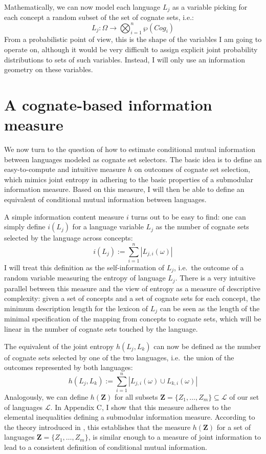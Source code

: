 Mathematically, we can now model each language $L_j$ as a variable picking for each concept a random subset of the set of cognate sets, i.e.:
\begin{equation}
  L_j: \Omega \rightarrow \bigotimes_{i = 1}^{n} \wp(Cog_i)
\end{equation}
From a probabilistic point of view, this is the shape of the variables I am going to operate on, although it would be very difficult to assign explicit joint probability distributions to sets of such variables. Instead, I will only use an information geometry on these variables.

\section{A cognate-based information measure}\label{sec:6.2}
We now turn to the question of how to estimate conditional mutual information between languages modeled as cognate set selectors. The basic idea is to define an easy-to-compute and intuitive measure $h$ on outcomes of cognate set selection, which mimics joint entropy in adhering to the basic properties of a submodular information measure. Based on this measure, I will then be able to define an equivalent of conditional mutual information between languages.

A simple information content measure $i$ turns out to be easy to find: one can simply define $i(L_j)$ for a language variable $L_j$ as the number of cognate sets selected by the language across concepts:
\begin{equation}
 i(L_j) := \sum_{i = 1}^n | L_{j,i}(\omega)|
\end{equation}
I will treat this definition as the self-information of $L_j$, i.e.\ the outcome of a random variable measuring the entropy of language $L_j$. There is a very intuitive parallel between this measure and the view of entropy as a measure of descriptive complexity: given a set of concepts and a set of cognate sets for each concept, the minimum description length for the lexicon of $L_j$ can be seen as the length of the minimal specification of the mapping from concepts to cognate sets, which will be linear in the number of cognate sets touched by the language.

The equivalent of the joint entropy $h(L_j,L_k)$ can now be defined as the number of cognate sets selected by one of the two languages, i.e.\ the union of the outcomes represented by both languages: 
\begin{equation}
 h(L_j,L_k) := \sum_{i = 1}^n | L_{j,i}(\omega) \cup L_{k,i}(\omega)|
\end{equation}
Analogously, we can define $h(\mathbf{Z})$ for all subsets $\mathbf{Z} = \{Z_1,\dots,Z_m\} \subseteq \mathcal{L}$ of our set of languages $\mathcal{L}$. In Appendix C, I show that this measure adheres to the elemental inequalities defining a submodular information measure. According to the theory introduced in , this establishes that the measure $h(\mathbf{Z})$ for a set of languages $\mathbf{Z} = \{Z_1,\dots,Z_m\}$, is similar enough to a measure of joint information to lead to a consistent definition of conditional mutual information.

